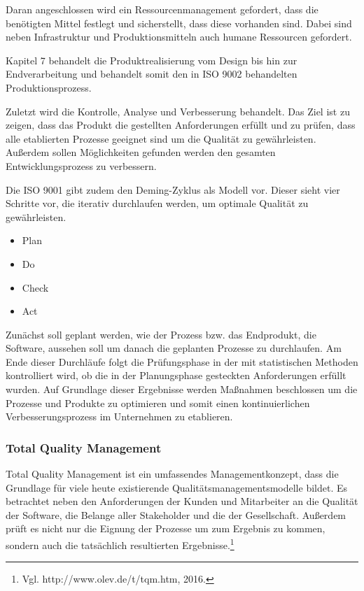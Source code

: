             Daran angeschlossen wird ein Ressourcenmanagement gefordert, dass die benötigten Mittel festlegt und sicherstellt, dass diese vorhanden sind. Dabei sind neben Infrastruktur und Produktionsmitteln auch humane Ressourcen gefordert.

            Kapitel 7 behandelt die Produktrealisierung vom Design bis hin zur Endverarbeitung und behandelt somit den in ISO 9002 behandelten Produktionsprozess.

            Zuletzt wird die Kontrolle, Analyse und Verbesserung behandelt. Das Ziel ist zu zeigen, dass das Produkt die gestellten Anforderungen erfüllt und zu prüfen, dass alle etablierten Prozesse geeignet sind um die Qualität zu gewährleisten. Außerdem sollen Möglichkeiten gefunden werden den gesamten Entwicklungsprozess zu verbessern.

            Die ISO 9001 gibt zudem den Deming-Zyklus als Modell vor. Dieser sieht vier Schritte vor, die iterativ durchlaufen werden, um optimale Qualität zu gewährleisten.
            \begin{itemize}
              \item Plan
              \item Do
              \item Check
              \item Act
            \end{itemize}
            Zunächst soll geplant werden, wie der Prozess bzw. das Endprodukt, die Software, aussehen soll um danach die geplanten Prozesse zu durchlaufen. Am Ende dieser Durchläufe folgt die Prüfungsphase in der mit statistischen Methoden kontrolliert wird, ob die in der Planungsphase gesteckten Anforderungen erfüllt wurden. Auf Grundlage dieser Ergebnisse werden Maßnahmen beschlossen um die Prozesse und Produkte zu optimieren und somit einen kontinuierlichen Verbesserungsprozess im Unternehmen zu etablieren.

            \subsubsection{Total Quality Management}

            Total Quality Management ist ein umfassendes Managementkonzept, dass die Grundlage für viele heute existierende Qualitätsmanagementsmodelle bildet. Es betrachtet neben den Anforderungen der Kunden und Mitarbeiter an die Qualität der Software, die Belange aller Stakeholder und die der Gesellschaft. Außerdem prüft es nicht nur die Eignung der Prozesse um zum Ergebnis zu kommen, sondern auch die tatsächlich resultierten Ergebnisse.\footnote{Vgl. http://www.olev.de/t/tqm.htm, 2016.}

